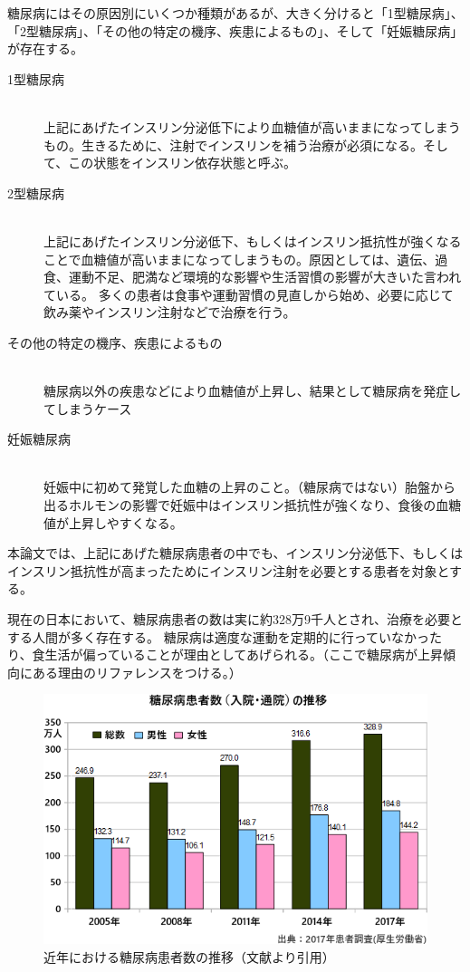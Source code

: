糖尿病にはその原因別にいくつか種類があるが、大きく分けると「1型糖尿病」、「2型糖尿病」、「その他の特定の機序、疾患によるもの」、そして「妊娠糖尿病」が存在する。\cite{diabetes}

\begin{description}
  \item [1型糖尿病]\mbox{}\\
    上記にあげたインスリン分泌低下により血糖値が高いままになってしまうもの。生きるために、注射でインスリンを補う治療が必須になる。そして、この状態をインスリン依存状態と呼ぶ。
  \item [2型糖尿病]\mbox{}\\
    上記にあげたインスリン分泌低下、もしくはインスリン抵抗性が強くなることで血糖値が高いままになってしまうもの。原因としては、遺伝、過食、運動不足、肥満など環境的な影響や生活習慣の影響が大きいた言われている。
    多くの患者は食事や運動習慣の見直しから始め、必要に応じて飲み薬やインスリン注射などで治療を行う。
  \item [その他の特定の機序、疾患によるもの]\mbox{}\\
    糖尿病以外の疾患などにより血糖値が上昇し、結果として糖尿病を発症してしまうケース
  \item [妊娠糖尿病]\mbox{}\\
    妊娠中に初めて発覚した血糖の上昇のこと。（糖尿病ではない）胎盤から出るホルモンの影響で妊娠中はインスリン抵抗性が強くなり、食後の血糖値が上昇しやすくなる。
\end{description}

本論文では、上記にあげた糖尿病患者の中でも、インスリン分泌低下、もしくはインスリン抵抗性が高まったためにインスリン注射を必要とする患者を対象とする。

現在の日本において、糖尿病患者の数は実に約328万9千人とされ、治療を必要とする人間が多く存在する。\cite{diabetes_statistics}
糖尿病は適度な運動を定期的に行っていなかったり、食生活が偏っていることが理由としてあげられる。（ここで糖尿病が上昇傾向にある理由のリファレンスをつける。）

\begin{figure}[htbp]
  \caption{近年における糖尿病患者数の推移（文献\cite{diabetes_statistics}より引用）}
  \label{fig:diabetes_total_number}
  \begin{center}
    \includegraphics[bb=0 0 900 400,width=25cm]{assets/diabetes_total_number.png}
  \end{center}
\end{figure}

